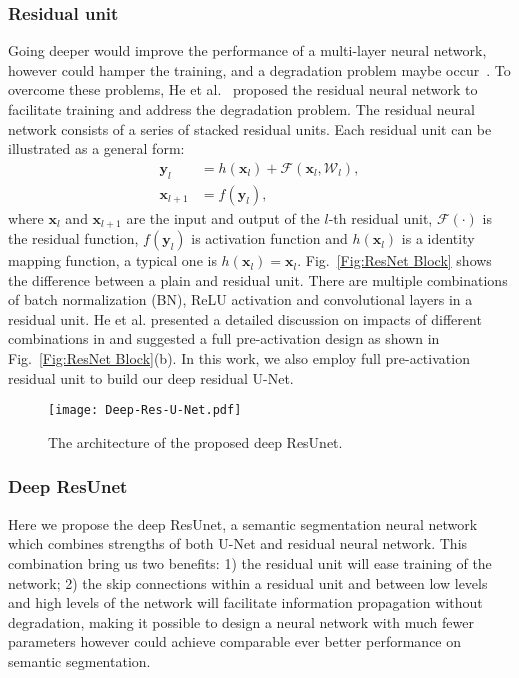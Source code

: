 \documentclass[journal]{IEEEtran}
\begin{document}
\subsubsection{Residual unit}
Going deeper would improve the performance of a multi-layer neural network, however could hamper the training, and a degradation problem maybe occur~\cite{resnet2015deep}. To overcome these problems, He et al.~\cite{resnet2015deep} proposed the residual neural network to facilitate  training and address the degradation problem. The residual neural network consists of a series of stacked residual units. Each residual unit can be illustrated as a general form:
\begin{equation}\label{Equ:Residual Uint}
\begin{split}
\mathbf{y}_{l}\ \ \ & = h(\mathbf{x}_{l})+\mathcal{F}(\mathbf{x}_{l}, \mathcal{W}_{l}), \\
\mathbf{x}_{l+1} & = f(\mathbf{y}_{l}),
\end{split}
\end{equation}
where $\mathbf{x}_{l}$ and $\mathbf{x}_{l+1}$ are the input and output of the $l$-th residual unit, $\mathcal{F}(\cdot)$ is the residual function, $f(\mathbf{y}_l)$ is activation function and $h(\mathbf{x}_{l})$ is a identity mapping function, a typical one is  $h(\mathbf{x}_{l}) = \mathbf{x}_{l}$. Fig.~\ref{Fig:ResNet Block} shows the difference between a plain and residual unit. There are multiple combinations of batch normalization (BN), ReLU activation and convolutional layers in a residual unit. He et al. presented a detailed discussion on impacts of different combinations in \cite{resnet2016} and suggested a full pre-activation design as shown in  Fig.~\ref{Fig:ResNet Block}(b). In this work, we also employ full pre-activation residual unit to build our deep residual U-Net. 
\begin{figure}[tbp!]
	\begin{center}
		\texttt{[image: Deep-Res-U-Net.pdf]}
		\caption{The architecture of the proposed deep ResUnet.}
		\label{Fig:Deep Res-U-Net}
	\end{center}
	\vspace{-0.7cm}
\end{figure}

\subsubsection{Deep ResUnet}
Here we propose the deep ResUnet, a semantic segmentation neural network which combines strengths of both U-Net and residual neural network. This combination bring us two benefits: 1) the residual unit will ease training of the network; 2) the skip connections within a residual unit and between low levels and high levels of the network will facilitate information propagation without degradation, making it possible to design a neural network with much fewer parameters however could achieve comparable ever better performance on semantic segmentation. 
\end{document}
